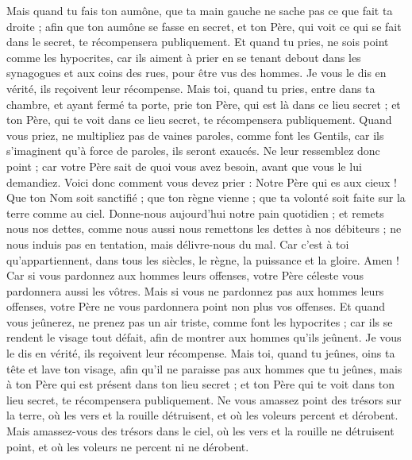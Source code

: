 \begin{multicols}{2}
Mais quand tu fais ton aumône, que ta main gauche ne sache pas ce que fait ta droite ;
afin que ton aumône se fasse en secret, et ton Père, qui voit ce qui se fait dans le secret, te récompensera publiquement.
Et quand tu pries, ne sois point comme les hypocrites, car ils aiment à prier en se tenant debout dans les synagogues et aux coins des rues, pour être vus des hommes. Je vous le dis en vérité, ils reçoivent leur récompense.
Mais toi, quand tu pries, entre dans ta chambre, et ayant fermé ta porte, prie ton Père, qui est là dans ce lieu secret ; et ton Père, qui te voit dans ce lieu secret, te récompensera publiquement.
Quand vous priez, ne multipliez pas de vaines paroles, comme font les Gentils, car ils s'imaginent qu'à force de paroles, ils seront exaucés.
Ne leur ressemblez donc point ; car votre Père sait de quoi vous avez besoin, avant que vous le lui demandiez.
Voici donc comment vous devez prier : Notre Père qui es aux cieux ! Que ton Nom soit sanctifié ;
que ton règne vienne ; que ta volonté soit faite sur la terre comme au ciel.
Donne-nous aujourd'hui notre pain quotidien ;
et remets nous nos dettes, comme nous aussi nous remettons les dettes à nos débiteurs ;
ne nous induis pas en tentation, mais délivre-nous du mal. Car c'est à toi qu'appartiennent, dans tous les siècles, le règne, la puissance et la gloire. Amen !
Car si vous pardonnez aux hommes leurs offenses, votre Père céleste vous pardonnera aussi les vôtres.
Mais si vous ne pardonnez pas aux hommes leurs offenses, votre Père ne vous pardonnera point non plus vos offenses.
Et quand vous jeûnerez, ne prenez pas un air triste, comme font les hypocrites ; car ils se rendent le visage tout défait, afin de montrer aux hommes qu'ils jeûnent. Je vous le dis en vérité, ils reçoivent leur récompense.
Mais toi, quand tu jeûnes, oins ta tête et lave ton visage,
afin qu'il ne paraisse pas aux hommes que tu jeûnes, mais à ton Père qui est présent dans ton lieu secret ; et ton Père qui te voit dans ton lieu secret, te récompensera publiquement.
Ne vous amassez point des trésors sur la terre, où les vers et la rouille détruisent, et où les voleurs percent et dérobent.
Mais amassez-vous des trésors dans le ciel, où les vers et la rouille ne détruisent point, et où les voleurs ne percent ni ne dérobent.

\end{multicols}
